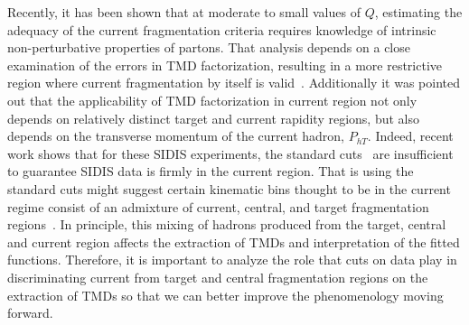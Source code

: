 \documentclass[final,3p,times,onecolumn,sort&compress,hidelinks]{elsarticle}
\newcommand{\cbl}{\color{blue}}
\begin{document}
 Recently, it has been shown that at moderate to small values of $Q$, estimating the adequacy of the current fragmentation criteria requires knowledge of intrinsic non-perturbative properties of partons. That analysis depends on a close examination of the errors in TMD factorization, resulting in
 a more restrictive region where current fragmentation by itself is valid~\cite{Boglione:2016bph}.
 Additionally it was pointed out that the applicability of TMD factorization  %
 in  current region not only depends on 
 relatively distinct target and current rapidity regions, but also depends on the transverse momentum of the current hadron, $P_{hT}$.
 Indeed, recent work shows that for these SIDIS experiments, the standard cuts~\cite{Anselmino:2013lza,Bacchetta:2017gcc}
 are insufficient to guarantee %
  SIDIS data is firmly in the current region.
  That is using the  standard cuts
 might suggest 
 certain kinematic bins thought to be
 in the current regime consist of an admixture of
 current, central, and  target fragmentation regions~\cite{Boglione:2016bph}.  In principle, this mixing of hadrons produced from the target, central and current region {\cbl affects} the extraction of TMDs and interpretation of the fitted functions.  {\cbl Therefore, it is important to analyze the role that   cuts on data play in
 discriminating  current  from target and central fragmentation regions on the
 extraction of TMDs so that we can better improve the phenomenology moving forward.}

\end{document}
